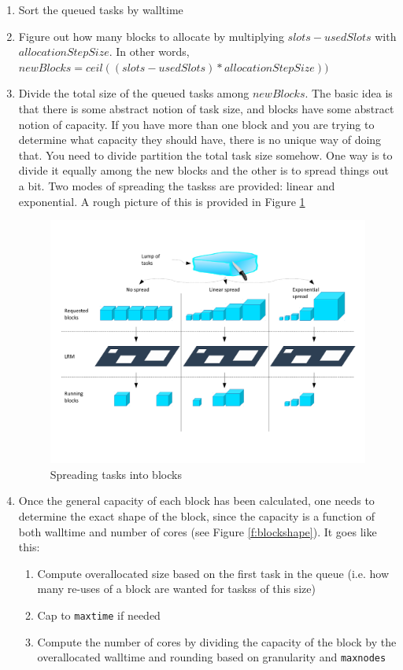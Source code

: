 \documentclass[12pt,letterpaper]{report}
\begin{document}
\begin{enumerate}
	\item Sort the queued tasks by walltime
	\item Figure out how many blocks to allocate by multiplying $slots - usedSlots$ with $allocationStepSize$. In other words, $newBlocks = ceil((slots - usedSlots) * allocationStepSize))$
	
	\item Divide the total size of the queued tasks among $newBlocks$. The basic idea is that there is some abstract notion of task size, and blocks have some abstract notion of capacity. If you have more than one block and you are trying to determine what capacity they should have, there is no unique way of doing that. You need to divide partition the total task size somehow. One way is to divide it equally among the new blocks and the other is to spread things out a bit. Two modes of spreading the taskss are provided: linear and exponential. A rough picture of this is provided in Figure \ref{f:spread}
	
	\begin{figure}[h]
		\includegraphics[scale=0.5]{spread.pdf}
		\caption{Spreading tasks into blocks}
		\label{f:spread}
	\end{figure}
	
	\item Once the general capacity of each block has been calculated, one needs to determine the exact shape of the block, since the capacity is a function of both walltime and number of cores (see Figure \ref{f:blockshape}). It goes like this:
		\begin{enumerate}
			\item Compute overallocated size based on the first task in the queue (i.e. how many re-uses of a block are wanted for taskss of this size)
			\item Cap to \texttt{maxtime} if needed
			\item Compute the number of cores by dividing the capacity of the block by the overallocated walltime and rounding based on granularity and \texttt{maxnodes}
		\end{enumerate}
		

\end{enumerate}
\end{document}
